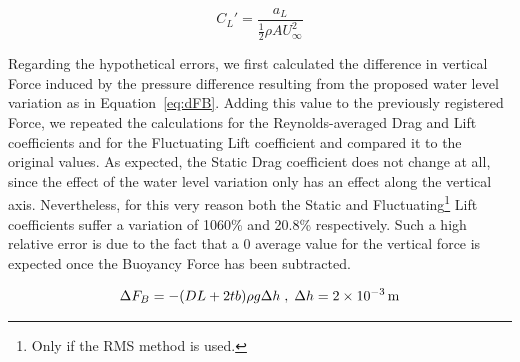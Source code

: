 \documentclass[12pt]{article}
\begin{document}
        \begin{equation} \label{eq:lift_p}
                C_L' = \frac{a_L}{\frac{1}{2} \rho A U_\infty^2}
        \end{equation}

        Regarding the hypothetical errors, we first calculated the difference in vertical Force induced by the pressure difference resulting from the proposed water level variation as in Equation~\ref{eq:dFB}. Adding this value to the previously registered Force, we repeated the calculations for the Reynolds-averaged Drag and Lift coefficients and for the Fluctuating Lift coefficient and compared it to the original values. As expected, the Static Drag coefficient does not change at all, since the effect of the water level variation only has an effect along the vertical axis. Nevertheless, for this very reason both the Static and Fluctuating\footnote{Only if the RMS method is used.} Lift coefficients suffer a variation of 1060\% and 20.8\% respectively. Such a high relative error is due to the fact that a 0 average value for the vertical force is expected once the Buoyancy Force has been subtracted.

        \begin{equation} \label{eq:dFB}
                \Delta F_B = - (D L + 2 t b) \rho g \Delta h \; , \; \Delta h = \SI{2E-3}{\metre}
        \end{equation}



\end{document}
